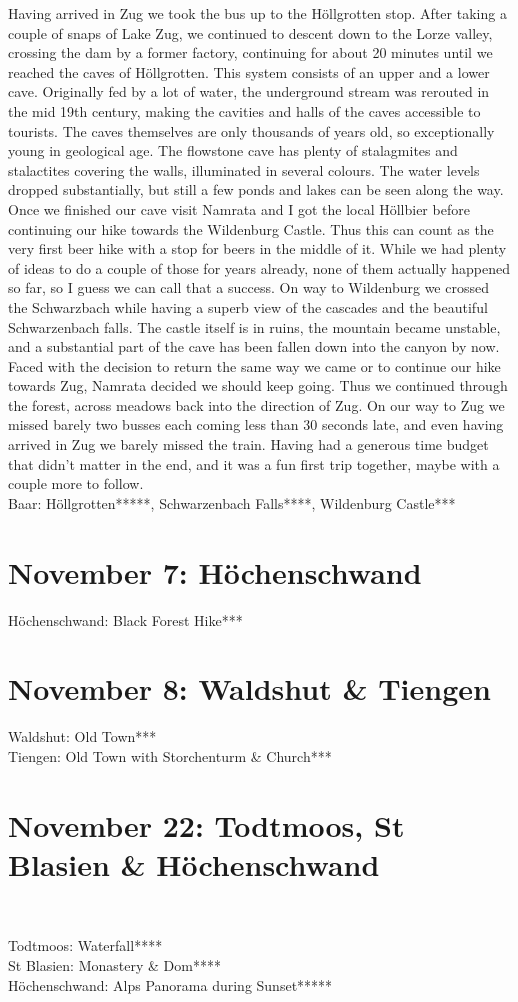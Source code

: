 Having arrived in Zug we took the bus up to the H\"ollgrotten stop. After taking a couple of snaps of Lake Zug, we continued to descent down to the Lorze valley, crossing the dam by a former factory, continuing for about 20 minutes until we reached the caves of H\"ollgrotten. This system consists of an upper and a lower cave. Originally fed by a lot of water, the underground stream was rerouted in the mid 19th century, making the cavities and halls of the caves accessible to tourists. The caves themselves are only thousands of years old, so exceptionally young in geological age. The flowstone cave has plenty of stalagmites and stalactites covering the walls, illuminated in several colours. The water levels dropped substantially, but still a few ponds and lakes can be seen along the way.\\
Once we finished our cave visit Namrata and I got the local H\"ollbier before continuing our hike towards the Wildenburg Castle. Thus this can count as the very first beer hike with a stop for beers in the middle of it. While we had plenty of ideas to do a couple of those for years already, none of them actually happened so far, so I guess we can call that a success. On way to Wildenburg we crossed the Schwarzbach while having a superb view of the cascades and the beautiful Schwarzenbach falls. The castle itself is in ruins, the mountain became unstable, and a substantial part of the cave has been fallen down into the canyon by now. Faced with the decision to return the same way we came or to continue our hike towards Zug, Namrata decided we should keep going. Thus we continued through the forest, across meadows back into the direction of Zug. On our way to Zug we missed barely two busses each coming less than 30 seconds late, and even having arrived in Zug we barely missed the train. Having had a generous time budget that didn't matter in the end, and it was a fun first trip together, maybe with a couple more to follow.\\

Baar: H\"ollgrotten*****, Schwarzenbach Falls****, Wildenburg Castle***
 
\section{November 7: H\"ochenschwand}
\label{2021HoechenschwandI}

H\"ochenschwand: Black Forest Hike***

\section{November 8: Waldshut \& Tiengen}
\label{2021WaldshutTiengen}

Waldshut: Old Town***\\
Tiengen: Old Town with Storchenturm \& Church***\\

\section{November 22: Todtmoos, St Blasien \& H\"ochenschwand}\
\label{2021:Todtmoos}

Todtmoos: Waterfall****\\
St Blasien: Monastery \& Dom****\\
H\"ochenschwand: Alps Panorama during Sunset*****\\

